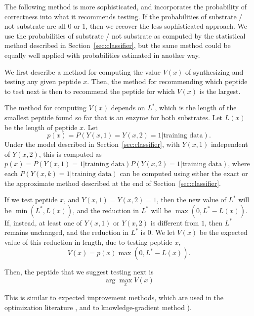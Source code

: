 \documentclass[12pt]{article}
\newcommand{\data}{\text{training data}}
\begin{document}
The following method is more sophisticated, and incorporates the probability of
correctness into what it recommends testing.  If the probabilities of substrate
/ not substrate are all 0 or 1, then we recover the less sophisticated approach.
We use the probabilities of substrate / not substrate as computed by the
statistical method described in Section~\ref{sec:classifier}, but the same
method could be equally well applied with probabilities estimated in another
way.

We first describe a method for computing the value $V(x)$ of synthesizing and testing any given peptide $x$.  Then, the method for recommending which peptide to test next is then to recommend the peptide for which $V(x)$ is the largest.

The method for computing $V(x)$ depends on $L^*$, which is the length of the smallest peptide found so far that is an enzyme for both substrates.  
Let $L(x)$ be the length of peptide $x$.
Let 
\begin{equation*}
  p(x) = P\left(Y(x,1)=Y(x,2)=1 | \data\right).
\end{equation*}
Under the model described in Section~\ref{sec:classifier}, with $Y(x,1)$ independent of $Y(x,2)$, this is computed as $p(x) = P\left(Y(x,1)=1 | \data\right) P\left(Y(x,2)=1 | \data\right)$, where each $P(Y(x,k)=1 | \data)$ can be computed using either the exact or the approximate method described at the end of Section~\ref{sec:classifier}.

If we test peptide $x$, and $Y(x,1)=Y(x,2)=1$, then the new value of $L^*$ will be $\min(L^*,L(x))$, and the reduction in $L^*$ will be $\max(0,L^*-L(x))$.
If, instead, at least one of $Y(x,1)$ or $Y(x,2)$ is different from $1$, then $L^*$ remains unchanged, and the reduction in $L^*$ is $0$.  
We let $V(x)$ be the expected value of this reduction in length, due to testing peptide $x$,
\begin{equation*}
  V(x) = p(x)\max(0,L^*-L(x)).
\end{equation*}

Then, the peptide that we suggest testing next is 
\begin{equation*}
  \arg\max_x V(x)
\end{equation*}

This is similar to expected improvement methods, which are used in the optimization literature \cite{JoScWe98},
and to knowledge-gradient method \cite{PoRy12,PoFr08}).  
\end{document}
